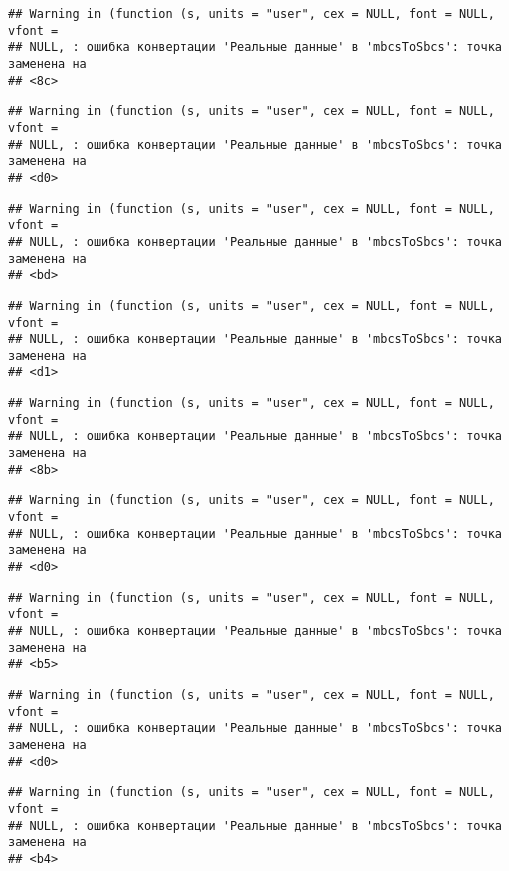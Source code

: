 \documentclass[
]{article}
\begin{document}
\begin{verbatim}
## Warning in (function (s, units = "user", cex = NULL, font = NULL, vfont =
## NULL, : ошибка конвертации 'Реальные данные' в 'mbcsToSbcs': точка заменена на
## <8c>
\end{verbatim}

\begin{verbatim}
## Warning in (function (s, units = "user", cex = NULL, font = NULL, vfont =
## NULL, : ошибка конвертации 'Реальные данные' в 'mbcsToSbcs': точка заменена на
## <d0>
\end{verbatim}

\begin{verbatim}
## Warning in (function (s, units = "user", cex = NULL, font = NULL, vfont =
## NULL, : ошибка конвертации 'Реальные данные' в 'mbcsToSbcs': точка заменена на
## <bd>
\end{verbatim}

\begin{verbatim}
## Warning in (function (s, units = "user", cex = NULL, font = NULL, vfont =
## NULL, : ошибка конвертации 'Реальные данные' в 'mbcsToSbcs': точка заменена на
## <d1>
\end{verbatim}

\begin{verbatim}
## Warning in (function (s, units = "user", cex = NULL, font = NULL, vfont =
## NULL, : ошибка конвертации 'Реальные данные' в 'mbcsToSbcs': точка заменена на
## <8b>
\end{verbatim}

\begin{verbatim}
## Warning in (function (s, units = "user", cex = NULL, font = NULL, vfont =
## NULL, : ошибка конвертации 'Реальные данные' в 'mbcsToSbcs': точка заменена на
## <d0>
\end{verbatim}

\begin{verbatim}
## Warning in (function (s, units = "user", cex = NULL, font = NULL, vfont =
## NULL, : ошибка конвертации 'Реальные данные' в 'mbcsToSbcs': точка заменена на
## <b5>
\end{verbatim}

\begin{verbatim}
## Warning in (function (s, units = "user", cex = NULL, font = NULL, vfont =
## NULL, : ошибка конвертации 'Реальные данные' в 'mbcsToSbcs': точка заменена на
## <d0>
\end{verbatim}

\begin{verbatim}
## Warning in (function (s, units = "user", cex = NULL, font = NULL, vfont =
## NULL, : ошибка конвертации 'Реальные данные' в 'mbcsToSbcs': точка заменена на
## <b4>
\end{verbatim}
\end{document}
